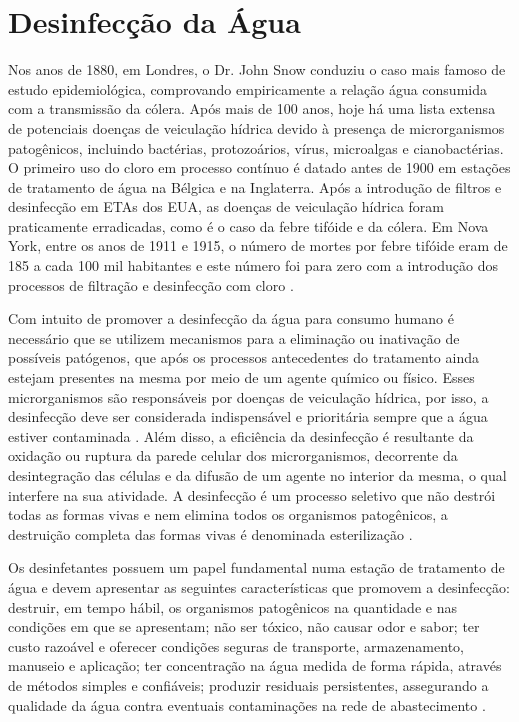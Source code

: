 \section{Desinfecção da Água}

Nos anos de 1880, em Londres, o Dr. John Snow conduziu o caso mais famoso de estudo epidemiológica, comprovando empiricamente a relação água consumida com a transmissão da cólera. Após mais de 100 anos, hoje há uma lista extensa de potenciais doenças de veiculação hídrica devido à presença de microrganismos patogênicos, incluindo bactérias, protozoários, vírus, microalgas e cianobactérias. O primeiro uso do cloro em processo contínuo é datado antes de 1900 em estações de tratamento de água na Bélgica e na Inglaterra. Após a introdução de filtros e desinfecção em ETAs dos EUA, as doenças de veiculação hídrica foram praticamente erradicadas, como é o caso da febre tifóide e da cólera. Em Nova York, entre os anos de 1911 e 1915, o número de mortes por febre tifóide eram de 185 a cada 100 mil habitantes e este número foi para zero com a introdução dos processos de filtração e desinfecção com cloro \cite{brasila,usepa99}.

Com intuito de promover a desinfecção da água para consumo humano é necessário que se utilizem mecanismos para a eliminação ou inativação de possíveis patógenos, que após os processos antecedentes do tratamento ainda estejam presentes na mesma por meio de um agente químico ou físico. Esses microrganismos são responsáveis por doenças de veiculação hídrica, por isso, a desinfecção deve ser considerada indispensável e prioritária sempre que a água estiver contaminada \cite{brasila}. Além disso, a eficiência da desinfecção é resultante da oxidação ou ruptura da parede celular dos microrganismos, decorrente da desintegração das células e da difusão de um agente no interior da mesma, o qual interfere na sua atividade. A desinfecção é um processo seletivo que não destrói todas as formas vivas e nem elimina todos os organismos patogênicos, a destruição completa das formas vivas é denominada esterilização \cite{dibernardo2017}.

Os desinfetantes possuem um papel fundamental numa estação de tratamento de água e devem apresentar as seguintes características que promovem a desinfecção: destruir, em tempo hábil, os organismos patogênicos na quantidade e nas condições em que se apresentam; não ser tóxico, não causar odor e sabor; ter custo razoável e oferecer condições seguras de transporte, armazenamento, manuseio e aplicação; ter concentração na água medida de forma rápida, através de métodos simples e confiáveis; produzir residuais persistentes, assegurando a qualidade da água contra eventuais contaminações na rede de abastecimento  \cite{dibernardo2017}.

